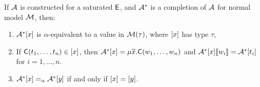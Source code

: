 \begin{lemma} 
\label{lem:model-completion}
If $\mathcal{A}$ is constructed for a saturated $\mathsf{E}$,
and $\mathcal{A}^\ast$ is a completion of $\mathcal{A}$ for normal model $\mathcal{M}$, then:
\begin{enumerate}
\item $\mathcal{A}^\ast [x]$ is $\alpha$-equivalent to a value in $\mathcal{M}( \tau )$, where $[x]$ has type $\tau$,
\item
If $\textsf{C}( t_1, \ldots, t_n ) \in [x]$,
then $\mathcal{A}^\ast [x] = \mu {\widetilde{x}}. \textsf{C}( w_1, \ldots, w_n )$
and $\mathcal{A}^\ast [x] [\![  w_i  ]\!] = \mathcal{A}^\ast [t_i]$ for $i = 1, \ldots, n$.
\item 
$\mathcal{A}^\ast [x] \mathrel{=_\alpha} \mathcal{A}^\ast [y]$ if and only if $[x] = [y]$.
\end{enumerate}
\end{lemma}
